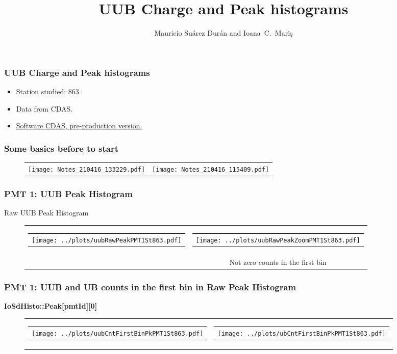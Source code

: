 \documentclass[aspectratio=169]{beamer}
\title{UUB Charge and Peak histograms}
\author{
  Mauricio Su\'arez Dur\'an and Ioana~C.~Mari\c{s}
}
\institute{IIHE-ULB}
\begin{document}
\begin{frame}
  \titlepage
\end{frame}


\begin{frame}
	\frametitle{UUB Charge and Peak histograms}
  \begin{itemize}
		\item Station studied: 863
    \item Data from CDAS.
		\item {\underline {Software CDAS, pre-production version.}}
	\end{itemize}
\end{frame}


\begin{frame}
	\frametitle{Some basics before to start}
	\begin{figure}
		\centering
		\begin{tabularx}{\textwidth}{C|C}
			\texttt{[image: Notes\_210416\_133229.pdf]}
			&
			\texttt{[image: Notes\_210416\_115409.pdf]}
		\end{tabularx}
	\end{figure}
\end{frame}



\begin{frame}
	\frametitle{PMT 1: UUB Peak Histogram}
	Raw UUB Peak Histogram
	\begin{figure}
		\centering
		\begin{tabularx}{\textwidth}{CC}
			\begin{tabular}{l}
				\texttt{[image: ../plots/uubRawPeakPMT1St863.pdf]}
			\end{tabular}
			&
			\begin{tabular}{l}
				\texttt{[image: ../plots/uubRawPeakZoomPMT1St863.pdf]}
			\end{tabular}
			\\
			& Not zero counts in the first bin
		\end{tabularx}
	\end{figure}
\end{frame}



\begin{frame}
	\frametitle{PMT 1: UUB and UB counts in the first bin in Raw Peak Histogram}
	{\bf IoSdHisto::Peak[pmtId][0]}
	\begin{figure}
		\centering
		\begin{tabularx}{\textwidth}{CC}
			\begin{tabular}{l}
				\texttt{[image: ../plots/uubCntFirstBinPkPMT1St863.pdf]}
			\end{tabular}
			&
			\begin{tabular}{l}
				\texttt{[image: ../plots/ubCntFirstBinPkPMT1St863.pdf]}
			\end{tabular}
		\end{tabularx}
	\end{figure}
\end{frame}
\end{document}
